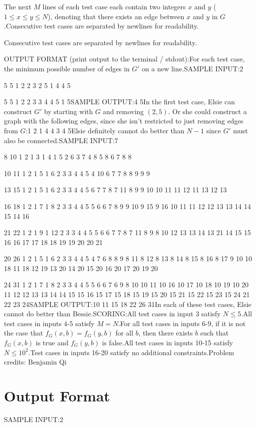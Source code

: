 \documentclass[12pt]{article}
\begin{document}
The next $M$ lines of each test case each contain two integers $x$ and $y$
($1\le x\le y\le N$), denoting that there exists an edge between $x$ and $y$ in
$G$.Consecutive test cases are separated by newlines for readability.

Consecutive test cases are separated by newlines for readability.

OUTPUT FORMAT (print output to the terminal / stdout):For each test case, the minimum possible number of edges in $G'$ on a new line.SAMPLE INPUT:2

5 5
1 2
2 3
2 5
1 4
4 5

5 5
1 2
2 3
3 4
4 5
1 5SAMPLE OUTPUT:4
5In the first test case, Elsie can construct $G'$ by starting with $G$ and
removing  $(2,5)$. Or she could construct a graph with the following edges,
since she isn't restricted to just removing edges from $G$:1 2
1 4
4 3
4 5Elsie definitely cannot do better than $N-1$ since $G'$ must also be connected.SAMPLE INPUT:7

8 10
1 2
1 3
1 4
1 5
2 6
3 7
4 8
5 8
6 7
8 8

10 11
1 2
1 5
1 6
2 3
3 4
4 5
4 10
6 7
7 8
8 9
9 9

13 15
1 2
1 5
1 6
2 3
3 4
4 5
6 7
7 8
7 11
8 9
9 10
10 11
11 12
11 13
12 13

16 18
1 2
1 7
1 8
2 3
3 4
4 5
5 6
6 7
8 9
9 10
9 15
9 16
10 11
11 12
12 13
13 14
14 15
14 16

21 22
1 2
1 9
1 12
2 3
3 4
4 5
5 6
6 7
7 8
7 11
8 9
8 10
12 13
13 14
13 21
14 15
15 16
16 17
17 18
18 19
19 20
20 21

20 26
1 2
1 5
1 6
2 3
3 4
4 5
4 7
6 8
8 9
8 11
8 12
8 13
8 14
8 15
8 16
8 17
9 10
10 18
11 18
12 19
13 20
14 20
15 20
16 20
17 20
19 20

24 31
1 2
1 7
1 8
2 3
3 4
4 5
5 6
6 7
6 9
8 10
10 11
10 16
10 17
10 18
10 19
10 20
11 12
12 13
13 14
14 15
15 16
15 17
15 18
15 19
15 20
15 21
15 22
15 23
15 24
21 22
23 24SAMPLE OUTPUT:10
11
15
18
22
26
31In each of these test cases, Elsie cannot do better than Bessie.SCORING:All test cases in input 3 satisfy $N\le 5$.All test cases in inputs 4-5 satisfy $M=N$.For all test cases in inputs 6-9, if it is not the case that
$f_G(x,b)=f_G(y,b)$ for all $b$, then there exists $b$ such that $f_G(x,b)$ is
true and $f_G(y,b)$ is false.All test cases in inputs 10-15 satisfy $N\le 10^2$.Test cases in inputs 16-20 satisfy no additional constraints.Problem credits: Benjamin Qi

\section*{Output Format}
SAMPLE INPUT:2
\end{document}
